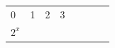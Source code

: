 {{\begin{center}
\begin{xtabular}[t]{|l|l|l|l|l|l|l|l|}
    
        0 &
    
    
        1 &
    
    
        2 &
    
    
        3%
     \tabularnewline{}
    
    
        
                \begin{math}{2}^{x}\end{math}
               &
    
    
         &
    
    
         &
    
    
         &
    

\end{xtabular}
\end{center}}}
